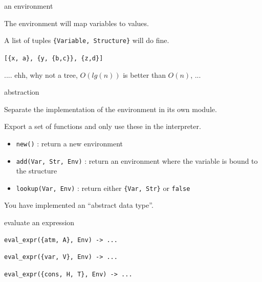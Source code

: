 \begin{frame}[fragile]{an environment}

The environment will map variables to values.

\pause\vspace{20pt}
A list of tuples \verb+{Variable, Structure}+ will do fine.

\pause\vspace{20pt}
\hspace{40pt}\verb+[{x, a}, {y, {b,c}}, {z,d}]+

\pause\vspace{20pt}
.... ehh, why not a tree, $O(lg(n))$ is better than $O(n)$, ... 

\end{frame}

\begin{frame}[fragile]{abstraction}

Separate the implementation of the environment in its own module.

\pause\vspace{20pt}Export a set of functions and only use these in the interpreter.


\begin{itemize}
  \pause\item \verb+new()+ : return a new environment
  \pause\item \verb+add(Var, Str, Env)+ : return an environment where the variable is bound to the structure
  \pause\item \verb+lookup(Var, Env)+ : return either \verb+{Var, Str}+ or \verb+false+ 
\end{itemize}


\pause\vspace{20pt}You have implemented an ``abstract data type''.

\end{frame}

\begin{frame}[fragile]{evaluate an expression}

\begin{verbatim}
eval_expr({atm, A}, Env) -> ...
\end{verbatim}
\begin{verbatim}
eval_expr({var, V}, Env) -> ...
\end{verbatim}
\begin{verbatim}
eval_expr({cons, H, T}, Env) -> ...
\end{verbatim}

\end{frame}


